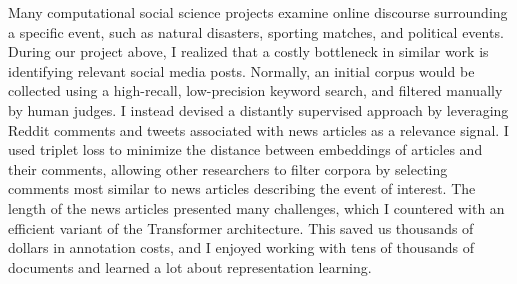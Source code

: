 
Many computational social science projects examine online discourse surrounding a specific event, such as natural disasters, sporting matches, and political events. During our project above, I realized that a costly bottleneck in similar work is identifying relevant social media posts. Normally, an initial corpus would be collected using a high-recall, low-precision keyword search, and filtered manually by human judges. I instead devised a distantly supervised approach by leveraging Reddit comments and tweets associated with news articles as a relevance signal. I used triplet loss to minimize the distance between embeddings of articles and their comments, allowing other researchers to filter corpora by selecting comments most similar to news articles describing the event of interest. The length of the news articles presented many challenges, which I countered with an efficient variant of the Transformer architecture. This saved us thousands of dollars in annotation costs, and I enjoyed working with tens of thousands of documents and learned a lot about representation learning.